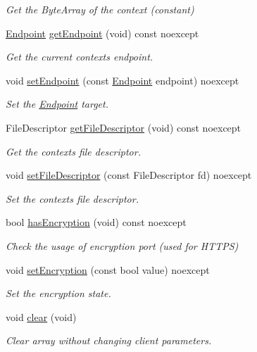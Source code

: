 \begin{DoxyCompactItemize}
\begin{DoxyCompactList}\small\item\em Get the Byte\+Array of the context (constant) \end{DoxyCompactList}\item 
\mbox{\hyperlink{classo_z_1_1_endpoint}{Endpoint}} \mbox{\hyperlink{classo_z_1_1_packet_a89367cc491fdfdb6bf88eda9bc4eb219}{get\+Endpoint}} (void) const noexcept
\begin{DoxyCompactList}\small\item\em Get the current context\textquotesingle{}s endpoint. \end{DoxyCompactList}\item 
void \mbox{\hyperlink{classo_z_1_1_packet_a2bcd9f2d612cbc1b59a8b7c99d706908}{set\+Endpoint}} (const \mbox{\hyperlink{classo_z_1_1_endpoint}{Endpoint}} endpoint) noexcept
\begin{DoxyCompactList}\small\item\em Set the \mbox{\hyperlink{classo_z_1_1_endpoint}{Endpoint}} target. \end{DoxyCompactList}\item 
File\+Descriptor \mbox{\hyperlink{classo_z_1_1_packet_a65cfd7021de4eaf78f716143b82cd4a1}{get\+File\+Descriptor}} (void) const noexcept
\begin{DoxyCompactList}\small\item\em Get the context\textquotesingle{}s file descriptor. \end{DoxyCompactList}\item 
void \mbox{\hyperlink{classo_z_1_1_packet_abf619a065ca7321c05fdcacc6353d47d}{set\+File\+Descriptor}} (const File\+Descriptor fd) noexcept
\begin{DoxyCompactList}\small\item\em Set the context\textquotesingle{}s file descriptor. \end{DoxyCompactList}\item 
bool \mbox{\hyperlink{classo_z_1_1_packet_abf9bd4979afb439272832d5a90f7d556}{has\+Encryption}} (void) const noexcept
\begin{DoxyCompactList}\small\item\em Check the usage of encryption port (used for H\+T\+T\+PS) \end{DoxyCompactList}\item 
void \mbox{\hyperlink{classo_z_1_1_packet_a7c6fc3f9ca25adf83be8e7c1f5ae5b70}{set\+Encryption}} (const bool value) noexcept
\begin{DoxyCompactList}\small\item\em Set the encryption state. \end{DoxyCompactList}\item 
void \mbox{\hyperlink{classo_z_1_1_packet_aa7eafcf9801973978216f2de4c09867d}{clear}} (void)
\begin{DoxyCompactList}\small\item\em Clear array without changing client parameters. \end{DoxyCompactList}\end{DoxyCompactItemize}


